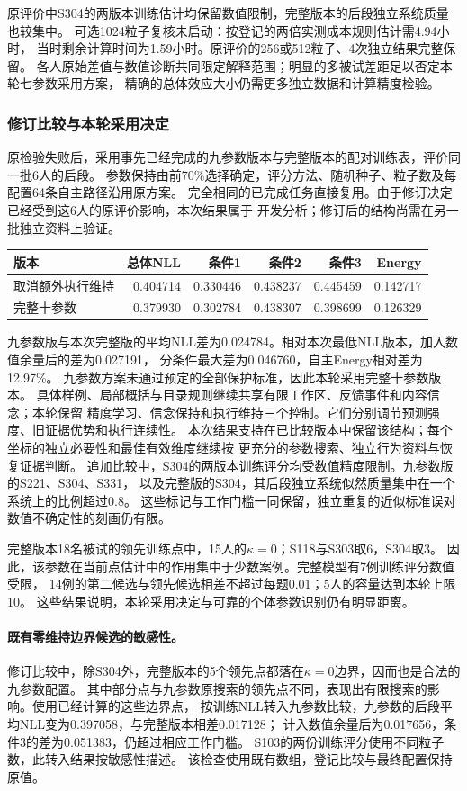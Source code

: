 \documentclass[11pt,a4paper]{article}
\numberwithin{equation}{section}
\begin{document}
原评价中S304的两版本训练估计均保留数值限制，完整版本的后段独立系统质量也较集中。
可选1024粒子复核未启动：按登记的两倍实测成本规则估计需4.94小时，
当时剩余计算时间为1.59小时。原评价的256或512粒子、4次独立结果完整保留。
各人原始差值与数值诊断共同限定解释范围；明显的多被试差距足以否定本轮七参数采用方案，
精确的总体效应大小仍需更多独立数据和计算精度检验。

\subsubsection{修订比较与本轮采用决定}
原检验失败后，采用事先已经完成的九参数版本与完整版本的配对训练表，评价同一批6人的后段。
参数保持由前70\%选择确定，评分方法、随机种子、粒子数及每配置64条自主路径沿用原方案。
完全相同的已完成任务直接复用。由于修订决定已经受到这6人的原评价影响，本次结果属于
开发分析；修订后的结构尚需在另一批独立资料上验证。
\begin{center}
\begin{tabularx}{\textwidth}{Y r r r r r}
\toprule
版本 & 总体NLL & 条件1 & 条件2 & 条件3 & Energy\\
\midrule
取消额外执行维持 & 0.404714 & 0.330446 & 0.438237 & 0.445459 & 0.142717 \\
完整十参数 & 0.379930 & 0.302784 & 0.438307 & 0.398699 & 0.126329 \\
\bottomrule
\end{tabularx}
\end{center}
九参数版与本次完整版的平均NLL差为0.024784。相对本次最低NLL版本，加入数值余量后的差为0.027191，
分条件最大差为0.046760，自主Energy相对差为12.97\%。
九参数方案未通过预定的全部保护标准，因此本轮采用完整十参数版本。
具体样例、局部概括与目录规则继续共享有限工作区、反馈事件和内容信念；本轮保留
精度学习、信念保持和执行维持三个控制。它们分别调节预测强度、旧证据优势和执行连续性。
本次结果支持在已比较版本中保留该结构；每个坐标的独立必要性和最佳有效维度继续按
更充分的参数搜索、独立行为资料与恢复证据判断。
追加比较中，S304的两版本训练评分均受数值精度限制。九参数版的S221、S304、S331，
以及完整版的S304，其后段独立系统似然质量集中在一个系统上的比例超过0.8。
这些标记与工作门槛一同保留，独立重复的近似标准误对数值不确定性的刻画仍有限。

完整版本18名被试的领先训练点中，15人的$\kappa=0$；S118与S303取6，S304取3。
因此，该参数在当前点估计中的作用集中于少数案例。完整模型有7例训练评分数值受限，
14例的第二候选与领先候选相差不超过每题0.01；5人的容量达到本轮上限10。
这些结果说明，本轮采用决定与可靠的个体参数识别仍有明显距离。

\paragraph{既有零维持边界候选的敏感性。}
修订比较中，除S304外，完整版本的5个领先点都落在$\kappa=0$边界，因而也是合法的九参数配置。
其中部分点与九参数原搜索的领先点不同，表现出有限搜索的影响。使用已经计算的这些边界点，
按训练NLL转入九参数比较，九参数的后段平均NLL变为0.397058，与完整版本相差0.017128；
计入数值余量后为0.017656，条件3的差为0.051383，仍超过相应工作门槛。
S103的两份训练评分使用不同粒子数，此转入结果按敏感性描述。
该检查使用既有数组，登记比较与最终配置保持原值。
\end{document}
